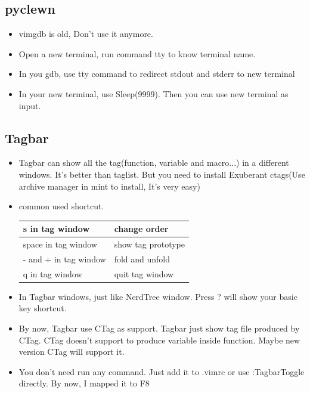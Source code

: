 \documentclass[a4paper,12pt,twoside]{book}
\begin{document}
\begin{itemize}
\begin{itemize}
\begin{tabular}{c|c}
\end{tabular}

\subsection{pyclewn}
\begin{itemize}
\item vimgdb is old, Don't use it anymore.
\item Open a new terminal, run command tty to know terminal name.
\item In you gdb, use tty command to redirect stdout and stderr to new terminal
\item In your new terminal, use Sleep(9999). Then you can use new terminal as input. 
\end{itemize}


\subsection{Tagbar}
\begin{itemize}
\item Tagbar can show all the tag(function, variable and macro...) in a different windows. It's better than taglist. But you need to install Exuberant ctags(Use archive manager in mint to install, It's very easy)

\item common used shortcut.	\\	
\begin{tabular}{|p{}|p{}|}
\hline 
s in tag window & change order \\ 
\hline 
space in tag window & show tag prototype  \\ 
\hline 
- and + in tag window & fold and unfold \\ 
\hline 
q in tag window & quit tag window \\ 
\hline 
\end{tabular}
\item In Tagbar windows, just like NerdTree window. Press ? will show your basic key shortcut. 
\item By now, Tagbar use CTag as support. Tagbar just show tag file produced by CTag. CTag doesn't support to produce variable inside function. Maybe new version CTag will support it. 
\item You don't need run any command. Just add it to .vimrc or use :TagbarToggle directly. By now, I mapped it to F8
\end{itemize}


\end{itemize}
\end{itemize}
\end{document}
